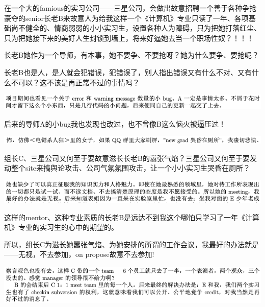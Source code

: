 \documentclass[9pt, b5paper]{article}
\begin{document}
在一个大的famious的实习公司——三星公司，会做出故意招聘一个善于各种争抢豪夺的senior长老B来故意人为给我这样一个《计算机》专业只读了一年、各项基础尚不健全的、情商弱弱的小小实习生，设置各种人为障碍，只为把她打落红尘、只为把她接下来的美好人生封锁到墙上，将来好逼她去当一个职场性奴？！！！

长老B她作为一个导师，有本事，她不要争、不要抢呀？她为什么要争、要抢呢？

长老B也是人，是人就会犯错误，犯错误了，别人指出错误又有什么不对、又有什么不可以？这不该是再正常不过的事情吗？

\begin{center}
\includegraphics[width=.9\linewidth]{./pic/readme_20210505_141145.png}
\end{center}

后来的导师A的小bug我也发现也改过，也不曾像B这么恼火被逼压过！

\begin{center}
\includegraphics[width=.9\linewidth]{./pic/backups_plans_20210505_132722.png}
\end{center}

组长C、三星公司又何至于要故意滋长长老B的嚣张气焰？三星公司又何至于要发动整个site来搞舆论攻击、公司气氛氛围攻击，让一个小小实习生哭昏在厕所？

\begin{center}
\includegraphics[width=.9\linewidth]{./pic/backups_plans_20210504_231527.png}
\end{center}

这样的mentor、这种专业素质的长老B是远达不到我这个哪怕只学习了一年《计算机》专业的实习生的心中的期望的。

所以，组长C为滋长她嚣张气焰、为她安排的所谓的工作会议，我最好的办法就是——无视，不去参加，on propose故意不去参加!

\begin{center}
\includegraphics[width=.9\linewidth]{./pic/backups_plans_20210504_231608.png}
\end{center}
\end{document}
